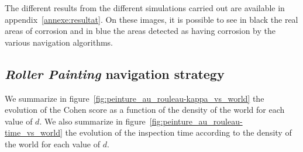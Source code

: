 \documentclass[english,RandD]{rapportPFE}  %
\begin{document}

		The different results from the different simulations carried out are available in appendix~\ref{annexe:resultat}.
		On these images, it is possible to see in black the real areas of corrosion and in blue the areas detected as having corrosion by the various navigation algorithms.
		\subsection*{\textit{Roller Painting} navigation strategy}
			We summarize in figure~\ref{fig:peinture_au_rouleau-kappa_vs_world} the evolution of the Cohen score as a function of the density of the world for each value of $d$.
			We also summarize in figure~\ref{fig:peinture_au_rouleau-time_vs_world} the evolution of the inspection time according to the density of the world for each value of $d$.
\end{document}
